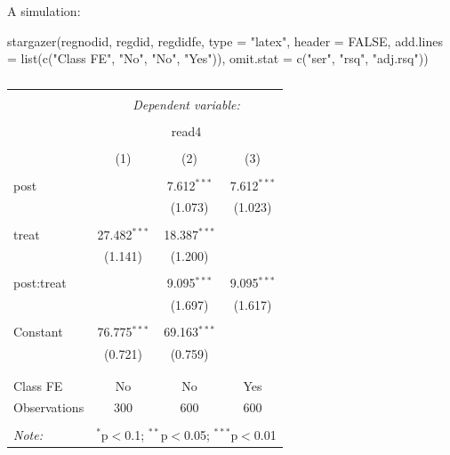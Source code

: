 \documentclass[
  ignorenonframetext,
]{beamer}
\newenvironment{Shaded}{\begin{snugshade}}{\end{snugshade}}
\newcommand{\AttributeTok}[1]{\textcolor[rgb]{0.77,0.63,0.00}{#1}}
\newcommand{\ConstantTok}[1]{\textcolor[rgb]{0.00,0.00,0.00}{#1}}
\newcommand{\FunctionTok}[1]{\textcolor[rgb]{0.00,0.00,0.00}{#1}}
\newcommand{\NormalTok}[1]{#1}
\newcommand{\StringTok}[1]{\textcolor[rgb]{0.31,0.60,0.02}{#1}}
\begin{document}
\begin{frame}[fragile]{A simulation:}
\protect\hypertarget{a-simulation-4}{}
\tiny

\begin{Shaded}
\begin{Highlighting}[]
\FunctionTok{stargazer}\NormalTok{(regnodid, regdid, regdidfe, }\AttributeTok{type =} \StringTok{"latex"}\NormalTok{, }\AttributeTok{header =} \ConstantTok{FALSE}\NormalTok{,}
    \AttributeTok{add.lines =} \FunctionTok{list}\NormalTok{(}\FunctionTok{c}\NormalTok{(}\StringTok{"Class FE"}\NormalTok{, }\StringTok{"No"}\NormalTok{, }\StringTok{"No"}\NormalTok{, }\StringTok{"Yes"}\NormalTok{)), }\AttributeTok{omit.stat =} \FunctionTok{c}\NormalTok{(}\StringTok{"ser"}\NormalTok{,}
        \StringTok{"rsq"}\NormalTok{, }\StringTok{"adj.rsq"}\NormalTok{))}
\end{Highlighting}
\end{Shaded}

\begin{table}[!htbp] \centering 
  \caption{} 
  \label{} 
\begin{tabular}{@{\extracolsep{5pt}}lccc} 
\\[-1.8ex]\hline 
\hline \\[-1.8ex] 
 & \multicolumn{3}{c}{\textit{Dependent variable:}} \\ 
\cline{2-4} 
\\[-1.8ex] & \multicolumn{3}{c}{read4} \\ 
\\[-1.8ex] & (1) & (2) & (3)\\ 
\hline \\[-1.8ex] 
 post &  & 7.612$^{***}$ & 7.612$^{***}$ \\ 
  &  & (1.073) & (1.023) \\ 
  & & & \\ 
 treat & 27.482$^{***}$ & 18.387$^{***}$ &  \\ 
  & (1.141) & (1.200) &  \\ 
  & & & \\ 
 post:treat &  & 9.095$^{***}$ & 9.095$^{***}$ \\ 
  &  & (1.697) & (1.617) \\ 
  & & & \\ 
 Constant & 76.775$^{***}$ & 69.163$^{***}$ &  \\ 
  & (0.721) & (0.759) &  \\ 
  & & & \\ 
\hline \\[-1.8ex] 
Class FE & No & No & Yes \\ 
Observations & 300 & 600 & 600 \\ 
\hline 
\hline \\[-1.8ex] 
\textit{Note:}  & \multicolumn{3}{r}{$^{*}$p$<$0.1; $^{**}$p$<$0.05; $^{***}$p$<$0.01} \\ 
\end{tabular} 
\end{table}
\end{frame}
\end{document}
